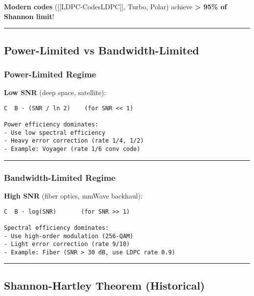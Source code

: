 \textbf{Modern codes} ({[}{[}LDPC-Codes\textbar LDPC{]}{]}, Turbo,
Polar) achieve \textbf{\textgreater{} 95\% of Shannon limit}!

\begin{center}\rule{0.5\linewidth}{0.5pt}\end{center}

\subsection{\texorpdfstring{ Power-Limited vs
Bandwidth-Limited}{ Power-Limited vs Bandwidth-Limited}}\label{power-limited-vs-bandwidth-limited}

\subsubsection{Power-Limited Regime}\label{power-limited-regime}

\textbf{Low SNR} (deep space, satellite):

\begin{verbatim}
C  B · (SNR / ln 2)    (for SNR << 1)

Power efficiency dominates:
- Use low spectral efficiency
- Heavy error correction (rate 1/4, 1/2)
- Example: Voyager (rate 1/6 conv code)
\end{verbatim}

\begin{center}\rule{0.5\linewidth}{0.5pt}\end{center}

\subsubsection{Bandwidth-Limited Regime}\label{bandwidth-limited-regime}

\textbf{High SNR} (fiber optics, mmWave backhaul):

\begin{verbatim}
C  B · log(SNR)       (for SNR >> 1)

Spectral efficiency dominates:
- Use high-order modulation (256-QAM)
- Light error correction (rate 9/10)
- Example: Fiber (SNR > 30 dB, use LDPC rate 0.9)
\end{verbatim}

\begin{center}\rule{0.5\linewidth}{0.5pt}\end{center}

\subsection{\texorpdfstring{ Shannon-Hartley Theorem
(Historical)}{ Shannon-Hartley Theorem (Historical)}}\label{shannon-hartley-theorem-historical}

